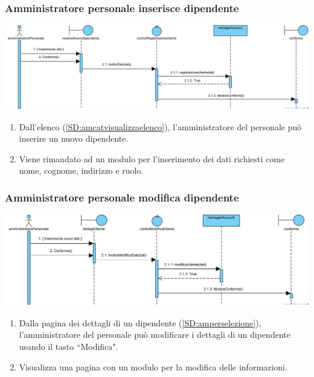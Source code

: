 \documentclass[12pt]{article}
\begin{document}
\subsubsection{Amministratore personale inserisce dipendente}
\label{SD:amperinserisce}
\begin{center}
\includegraphics[width=\textwidth]{SequenceDiagram/AmministratorePersonaleDipendenteInserisce}
\end{center}

\begin{enumerate}
\item Dall'elenco (\ref{SD:amcatvisualizzaelenco}), l'amministratore del personale può inserire un nuovo dipendente.
\item Viene rimandato ad un modulo per l'inserimento dei dati richiesti come nome, cognome, indirizzo e ruolo.
\end{enumerate}

\subsubsection{Amministratore personale modifica dipendente}
\label{SD:ampermodifica}
\begin{center}
\includegraphics[width=\textwidth]{SequenceDiagram/AmministratorePersonaleDipendenteModifica}
\end{center}

\begin{enumerate}
\item Dalla pagina dei dettagli di un dipendente (\ref{SD:amperselezione}), l'amministratore del personale può modificare i dettagli di un dipendente usando il tasto ``Modifica".
\item Visualizza una pagina con un modulo per la modifica delle informazioni.
\end{enumerate}
\end{document}
